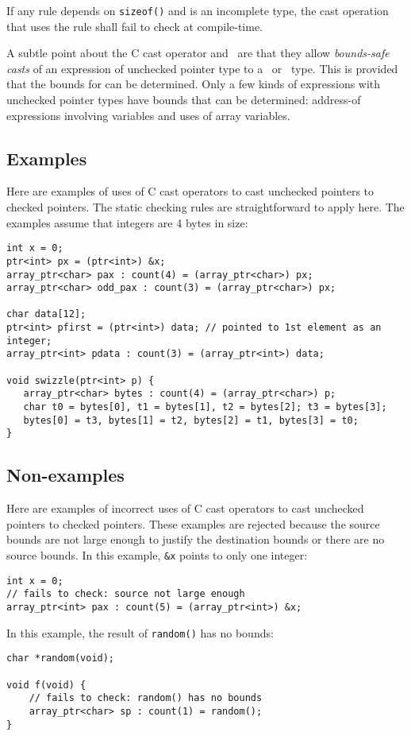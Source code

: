 If any rule depends on \texttt{sizeof()} and  is
an incomplete type, the cast operation that uses the rule shall fail
to check at compile-time.

A subtle point about the C cast operator and \dynamicboundscast\
are that they allow {\em bounds-safe casts} of an expression
 of unchecked pointer type to a \spanptr\ or
\arrayptr\ type. This is provided that the bounds for 
can be determined. Only a few kinds of expressions with unchecked pointer
types have bounds that can be determined: address-of expressions
involving variables and uses of array variables.

\subsection{Examples}
\label{section:pointer-cast-examples}

Here are examples of uses of C cast operators to cast unchecked
pointers to checked pointers.  The static checking rules are straightforward
to apply here.  The examples assume that integers are
4 bytes in size:
\begin{verbatim}
int x = 0;
ptr<int> px = (ptr<int>) &x;
array_ptr<char> pax : count(4) = (array_ptr<char>) px;
array_ptr<char> odd_pax : count(3) = (array_ptr<char>) px;

char data[12];
ptr<int> pfirst = (ptr<int>) data; // pointed to 1st element as an integer;
array_ptr<int> pdata : count(3) = (array_ptr<int>) data;

void swizzle(ptr<int> p) {
   array_ptr<char> bytes : count(4) = (array_ptr<char>) p;
   char t0 = bytes[0], t1 = bytes[1], t2 = bytes[2]; t3 = bytes[3];
   bytes[0] = t3, bytes[1] = t2, bytes[2] = t1, bytes[3] = t0;
}
\end{verbatim}

\subsection{Non-examples}

Here are examples of incorrect uses of C cast operators to cast unchecked
pointers to checked pointers.  These examples are rejected because the
source bounds are not large enough to justify the destination bounds or
there are no source bounds.
In this example, \verb|&x| points to only one integer:
\begin{verbatim}
int x = 0;
// fails to check: source not large enough
array_ptr<int> pax : count(5) = (array_ptr<int>) &x;
\end{verbatim}
In this example, the result of \texttt{random()} has no bounds:
\begin{verbatim}
char *random(void);

void f(void) {
    // fails to check: random() has no bounds
    array_ptr<char> sp : count(1) = random();
}
\end{verbatim}

